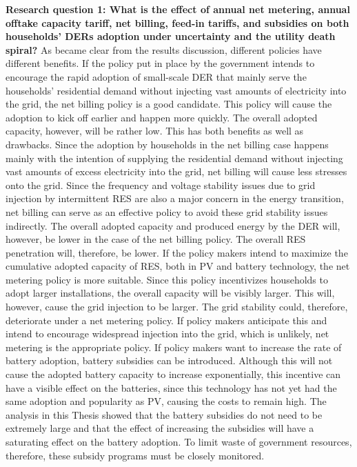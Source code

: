 \newline \newline  \noindent
\textbf{Research question 1: What is the effect of annual net metering, annual offtake capacity tariff, net billing, feed-in tariffs, and subsidies on both households' DERs adoption under uncertainty and the utility death spiral?}
\newline \newline \noindent
As became clear from the results discussion, different policies have different benefits. If the policy put in place by the government intends to encourage the rapid adoption of small-scale DER that mainly serve the households' residential demand without injecting vast amounts of electricity into the grid, the net billing policy is a good candidate. This policy will cause the adoption to kick off earlier and happen more quickly. The overall adopted capacity, however, will be rather low. This has both benefits as well as drawbacks. Since the adoption by households in the net billing case happens mainly with the intention of supplying the residential demand without injecting vast amounts of excess electricity into the grid, net billing will cause less stresses onto the grid. Since the frequency and voltage stability issues due to grid injection by intermittent RES are also a major concern in the energy transition, net billing can serve as an effective policy to avoid these grid stability issues indirectly. The overall adopted capacity and produced energy by the DER will, however, be lower in the case of the net billing policy. The overall RES penetration will, therefore, be lower. 
\newline \newline \noindent 
If the policy makers intend to maximize the cumulative adopted capacity of RES, both in PV and battery technology, the net metering policy is more suitable. Since this policy incentivizes households to adopt larger installations, the overall capacity will be visibly larger. This will, however, cause the grid injection to be larger. The grid stability could, therefore, deteriorate under a net metering policy. If policy makers anticipate this and intend to encourage widespread injection into the grid, which is unlikely, net metering is the appropriate policy. 
\newline \newline \noindent
If policy makers want to increase the rate of battery adoption, battery subsidies can be introduced. Although this will not cause the adopted battery capacity to increase exponentially, this incentive can have a visible effect on the batteries, since this technology has not yet had the same adoption and popularity as PV, causing the costs to remain high. The analysis in this Thesis showed that the battery subsidies do not need to be extremely large and that the effect of increasing the subsidies will have a saturating effect on the battery adoption. To limit waste of government resources, therefore, these subsidy programs must be closely monitored. 
